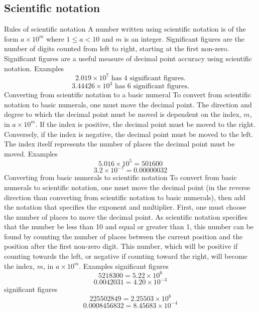 \begin{outline}
\subsection{Scientific notation}
	\1 Rules of scientific notation
		\2 A number written using scientific notation is of the form $a \times 10^m$ where $1 \leq a < 10$ and $m$ is an integer.
		\2 Significant figures are the number of digits counted from left to right, starting at the first non-zero. Significant figures are a useful measure of decimal point accuracy using scientific notation.
			\3 Examples
				\[2.019 \times 10^7 \text{ has 4 significant figures.}\]
				\[3.44426 \times 10^3 \text{ has 6 significant figures.}\]
	\1 Converting from scientific notation to a basic numeral
		\2 To convert from scientific notation to basic numerals, one must move the decimal point. The direction and degree to which the decimal point must be moved is dependent on the index, $m$, in $a \times 10^m$. If the index is positive, the decimal point must be moved to the right. Conversely, if the index is negative, the decimal point must be moved to the left. The index itself represents the number of places the decimal point must be moved.
			\3 Examples
				\[5.016 \times 10^5 = 501600\]
				\[3.2 \times 10^{-7} = 0.00000032\]
	\1 Converting from basic numerals to scientific notation
		\2 To convert from basic numerals to scientific notation, one must move the decimal point (in the reverse direction than converting from scientific notation to basic numerals), then add the notation that specifies the exponent and multiplier. First, one must choose the number of places to move the decimal point. As scientific notation specifies that the number be less than 10 and equal or greater than 1, this number can be found by counting the number of places between the current position and the position after the first non-zero digit. This number, which will be positive if counting towards the left, or negative if counting toward the right, will become the index, $m$, in $a \times 10^m$.
			\3 Examples
				 significant figures
					\[5218300 = 5.22 \times 10^6\]
					\[0.0042031 = 4.20 \times 10^{-3}\]
				 significant figures
					\[225502849 = 2.25503 \times 10^8\]
					\[0.0008456832 = 8.45683 \times 10^{-4}\]

\0

\end{outline}

